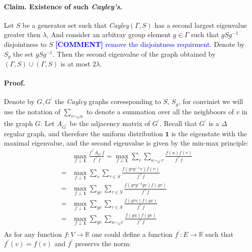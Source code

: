\documentclass[sigplan,screen]{acmart}
\newcommand{\commentt}[1]{\textcolor{blue}{ \textbf{[COMMENT]} #1}}
\newcommand{\ctt}[1]{\commentt{#1}}
\begin{document}
\begin{multicols*}{2}
  \paragraph{Claim. Existence of such \emph{Cayley's}.} Let $S$ be a generator set such that \emph{Cayley}$\left( \Gamma , S \right)$ has a second largest eigenvalue greater then $\lambda$, And consider an arbitray group element $g \in \Gamma$ such that $gSg^{-1}$ disjointness to $S$ \ctt{ remove the disjointness requirment}. Denote by $S_{g}$ the set $gSg^{-1}$. Then the second eigenvalue of the graph obtained by $\left( \Gamma, S \right) \cup \left( \Gamma, S \right)$ is at most $2\lambda$. 
  \paragraph{Proof.} Denote by $G,G^{\prime}$ the \emph{Cayley} graphs coressponding to $S$, $S_{g}$, for conviniet we will use the notation of $\sum_{v\sim_{G} u}$ to denote a summation over all the neighboors of $v$ in the graph $G$. Let $A_{G^{\prime}}$ be the adjacency matrix of $G^{\prime}$. Recall that $G^{\prime}$ is a  $\Delta$ regular graph, and therefore the uniform distribution $\mathbf{1}$ is the eigenstate with the maximal eigenvalue, and the second eigenvalue is given by the min-max principle: 
  \begin{equation*}
    \begin{split}
      & \max_{f \perp \mathbf{1}} { \frac{f^{\top}A_{G^{\prime}} f  }{ f^{\top}f}} = \max_{f \perp \mathbf{1}} { \sum_{v}  \sum_{u\sim_{G^{\prime}} v}\frac{f\left( u \right) f \left( v \right)  }{ f^{\top}f}} \\
      =  & \max_{f \perp \mathbf{1}} { \sum_{v}\sum_{\tau \in S} \frac{f\left( g\tau g^{-1} v \right) f \left( v \right)  }{ f^{\top}f}} \\ = & \max_{f \perp \mathbf{1}} { \sum_{gv} \sum_{\tau \in S}\frac{f\left( g\tau g^{-1} gv \right) f \left( gv \right)  }{ f^{\top}f}} \\  
      = & \max_{f \perp \mathbf{1}} { \sum_{gv}\sum_{\tau \in S}\frac{f\left( g \tau v \right) f \left( g v \right)  }{ f^{\top}f}} \\  = & \max_{f \perp \mathbf{1}} { \sum_{gv}\sum_{ u\sim_{G} v }\frac{f\left( gu \right) f \left( gv \right)  }{ f^{\top}f}} \\
         \end{split}
  \end{equation*}
  As for any function $f : V \rightarrow \mathbb{R} $ one could define a function $f^{\prime} : E \rightarrow \mathbb{R} $ such that $f^{\prime}\left( v \right) = f\left( v \right) $ and $f^{\prime}$ preservs the norm:    

\end{multicols*}
\end{document}
